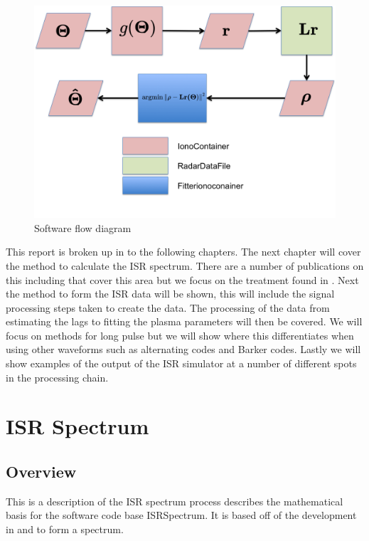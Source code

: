 \documentclass[10pt]{report}
\begin{document}
\begin{figure}[!h]
\centering
\includegraphics[width=6.0in]{softwareflowandmath}
\caption{Software flow diagram}
\label{fig:swflow}
\end{figure}

This report is broken up in to the following chapters. The next chapter will cover the method to calculate the ISR spectrum. There are a number of publications on this including \cite{dougherty:farley1960, hagfors1971, sheffield2010} that cover this area but we focus on the treatment found in \cite{kudeki:milla:1}. Next the method to form the ISR data will be shown, this will include the signal processing steps taken to create the data. The processing of the data from estimating the lags to fitting the plasma parameters will then be covered. We will focus on methods for long pulse but we will show where this differentiates when using other waveforms such as alternating codes and Barker codes. Lastly we will show examples of the output of the ISR simulator at a number of different spots in the processing chain.
 
\chapter{ISR Spectrum}
\section*{Overview}

This is a description of the ISR spectrum process describes the mathematical basis for the software code base ISRSpectrum. It is based off of the development in  \cite{kudeki:milla:1} and \cite{Kudeki:2006kx} to form a spectrum.
\end{document}
